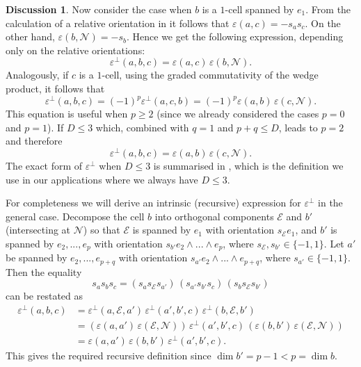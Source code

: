 \documentclass{elsarticle}
\theoremstyle{definition}
\newtheorem{discussion}[theorem]{Discussion}
\newcommand{\rel}{\varepsilon^\perp}
\begin{document}
\begin{discussion}
  Now consider the case when $b$ is a $1$-cell spanned by $e_1$.
  From the calculation of a relative orientation in
  it follows that
  $\varepsilon(a, c) = - s_a s_c$.
  On the other hand, $\varepsilon(b, \mathcal{N}) = - s_b$.
  Hence we get the following expression, depending only on the relative orientations:
  \begin{equation}
    \rel(a, b, c) = \varepsilon(a, c)\, \varepsilon(b, \mathcal{N}).
  \end{equation}
  Analogously, if $c$ is a $1$-cell, using the graded commutativity of the wedge product, it follows that
  \begin{equation}
    \rel(a, b, c)
    = (-1)^{p} \rel(a, c, b)
    = (-1)^{p} \varepsilon(a, b)\, \varepsilon(c, \mathcal{N}).
  \end{equation}
  This equation is useful when $p \geq 2$ (since we already considered the cases $p = 0$ and $p = 1$).
  If $D \leq 3$ which, combined with $q = 1$ and $p + q \leq D$, leads to $p = 2$ and therefore
  \begin{equation}
    \rel(a, b, c) = \varepsilon(a, b)\, \varepsilon(c, \mathcal{N}).
  \end{equation}
  The exact form of $\rel$ when $D \leq 3$ is summarised in ,
  which is the definition we use in our applications where we always have $D \leq 3$.

  For completeness we will derive an intrinsic (recursive) expression for $\rel$ in the general case.
  Decompose the cell $b$ into orthogonal components $\mathcal{E}$ and $b'$
  (intersecting at $\mathcal{N}$) so that
  $\mathcal{E}$ is spanned by $e_1$ with orientation $s_{\mathcal{E}} e_1$, and
  $b'$ is spanned by $e_2, ..., e_p$ with orientation $s_{b'} e_2 \wedge ... \wedge e_p$,
  where $s_{\mathcal{E}}, s_{b'} \in \{-1, 1\}$.
  Let $a'$ be spanned by $e_2, ..., e_{p + q}$ with orientation $s_{a'} e_2 \wedge ... \wedge e_{p + q}$, where $s_{a'} \in \{-1, 1\}$.
  Then the equality
  \begin{equation}
    s_a s_b s_c = (s_a s_{\mathcal{E}} s_{a'})\, (s_{a'} s_{b'} s_c)\, (s_b s_{\mathcal{E}} s_{b'})
  \end{equation}
  can be restated as
  \begin{equation}
    \label{eq:discrete/exterior_calculus/perpendicular_orientations_recursive}
    \begin{split}
      \rel(a, b, c)
      & = \rel(a, \mathcal{E}, a')\, \rel(a', b', c)\, \rel(b, \mathcal{E}, b') \\
      & = (\varepsilon(a, a')\, \varepsilon(\mathcal{E}, \mathcal{N}))\, \rel(a', b', c)\, (\varepsilon(b, b')\, \varepsilon(\mathcal{E}, \mathcal{N})) \\
      & = \varepsilon(a, a')\, \varepsilon(b, b')\, \rel(a', b', c).
    \end{split}
  \end{equation}
  This gives the required recursive definition since $\dim b' = p - 1 < p = \dim b$.


\end{discussion}
\end{document}
